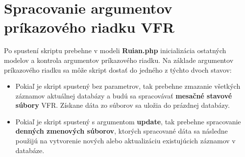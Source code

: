 \section{Spracovanie argumentov príkazového riadku VFR}
Po spustení skriptu prebehne v modeli {\bf Ruian.php} inicializácia ostatných modelov a kontrola argumentov príkazového riadku. Na základe argumentov príkazového riadku sa môže skript dostať do jedného z týchto dvoch stavov: \begin{itemize}
    \item {Pokiaľ je skript spustený bez parametrov, tak prebehne zmazanie všetkých záznamov aktuálnej databázy a budú sa spracovávať {\bf mesačné stavové súbory } VFR. Získane dáta zo súborov sa  uložia do prázdnej databázy.}
    \item{Pokiaľ je skript spustený s argumentom {\bf update}, tak prebehne spracovanie {\bf denných zmenových súborov}, ktorých spracované dáta sa následne použijú na vytvorenie nových alebo aktualizáciu existujúcich záznamov v databáze}.
\end{itemize} 

